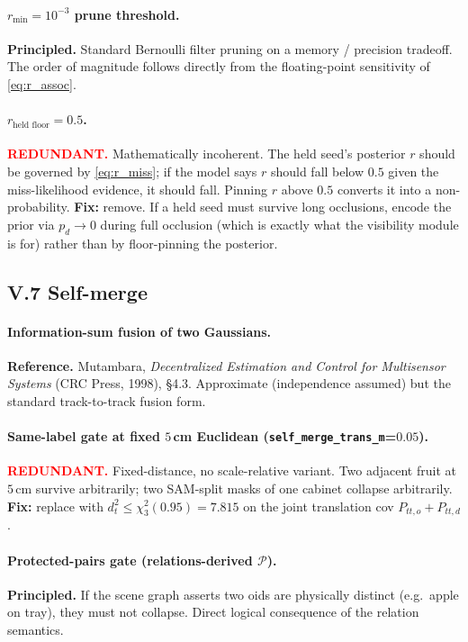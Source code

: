 \documentclass[11pt]{article}
\newcommand{\REDUNDANT}{\textcolor{red}{\textbf{REDUNDANT.}}}
\newcommand{\REFERENCE}{\textbf{Reference.}}
\newcommand{\PRINCIPLED}{\textbf{Principled.}}
\begin{document}
\paragraph{$r_{\min}=10^{-3}$ prune threshold.}
\PRINCIPLED{} Standard Bernoulli filter pruning on a memory /
precision tradeoff. The order of magnitude follows directly from the
floating-point sensitivity of \eqref{eq:r_assoc}.

\paragraph{$r_{\text{held floor}}=0.5$.}
\REDUNDANT{} Mathematically incoherent. The held seed's posterior
$r$ should be governed by \eqref{eq:r_miss}; if the model says $r$
should fall below $0.5$ given the miss-likelihood evidence, it should
fall. Pinning $r$ above $0.5$ converts it into a non-probability.
\textbf{Fix:} remove. If a held seed must survive long occlusions,
encode the prior via $p_d \to 0$ during full occlusion (which is
exactly what the visibility module is for) rather than by floor-pinning
the posterior.

\subsection*{V.7 Self-merge}

\paragraph{Information-sum fusion of two Gaussians.}
\REFERENCE{} Mutambara, \emph{Decentralized Estimation and Control
for Multisensor Systems} (CRC Press, 1998), \S 4.3. Approximate
(independence assumed) but the standard track-to-track fusion form.

\paragraph{Same-label gate at fixed $5$\,cm Euclidean
(\texttt{self\_merge\_trans\_m}=$0.05$).}
\REDUNDANT{} Fixed-distance, no scale-relative variant. Two adjacent
fruit at $5$\,cm survive arbitrarily; two SAM-split masks of one
cabinet collapse arbitrarily.
\textbf{Fix:} replace with $d^2_t \le \chi^2_3(0.95)=7.815$ on the
joint translation cov $P_{tt,o}+P_{tt,d}$.

\paragraph{Protected-pairs gate (relations-derived $\mathcal P$).}
\PRINCIPLED{} If the scene graph asserts two oids are physically
distinct (e.g.\ apple on tray), they must not collapse. Direct logical
consequence of the relation semantics.
\end{document}

